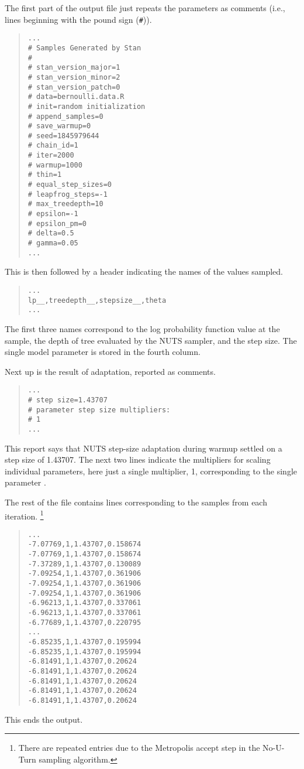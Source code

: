 The first part of the output file just repeats the parameters
as comments (i.e., lines beginning with the pound sign (\Verb|#|)).
%
\begin{quote}
\begin{Verbatim}
...
# Samples Generated by Stan
#
# stan_version_major=1
# stan_version_minor=2
# stan_version_patch=0
# data=bernoulli.data.R
# init=random initialization
# append_samples=0
# save_warmup=0
# seed=1845979644
# chain_id=1
# iter=2000
# warmup=1000
# thin=1
# equal_step_sizes=0
# leapfrog_steps=-1
# max_treedepth=10
# epsilon=-1
# epsilon_pm=0
# delta=0.5
# gamma=0.05
...
\end{Verbatim}
\end{quote}
%
This is then followed by a header indicating the
names of the values sampled.
%
\begin{quote}
\begin{Verbatim}
...
lp__,treedepth__,stepsize__,theta
...
\end{Verbatim}
\end{quote}
%
The first three names correspond to the log probability function
value at the sample, the depth of tree evaluated by the NUTS sampler,
and the step size.  The single model parameter  is
stored in the fourth column.

Next up is the result of adaptation, reported as comments.
%
\begin{quote}
\begin{Verbatim}
...
# step size=1.43707
# parameter step size multipliers:
# 1
...
\end{Verbatim}
\end{quote}
%
This report says that NUTS step-size adaptation during warmup
settled on a step size of 1.43707.  The next two lines
indicate the multipliers for scaling individual parameters, here
just a single multiplier, 1, corresponding to the single
parameter .

The rest of the file contains lines corresponding to the
samples from each iteration.%
%
\footnote{There are repeated entries due to the Metropolis accept step
in the No-U-Turn sampling algorithm.}
%
%
\begin{quote}
\begin{Verbatim}
...
-7.07769,1,1.43707,0.158674
-7.07769,1,1.43707,0.158674
-7.37289,1,1.43707,0.130089
-7.09254,1,1.43707,0.361906
-7.09254,1,1.43707,0.361906
-7.09254,1,1.43707,0.361906
-6.96213,1,1.43707,0.337061
-6.96213,1,1.43707,0.337061
-6.77689,1,1.43707,0.220795
...
-6.85235,1,1.43707,0.195994
-6.85235,1,1.43707,0.195994
-6.81491,1,1.43707,0.20624
-6.81491,1,1.43707,0.20624
-6.81491,1,1.43707,0.20624
-6.81491,1,1.43707,0.20624
-6.81491,1,1.43707,0.20624
\end{Verbatim}
\end{quote}
%
This ends the output.  

